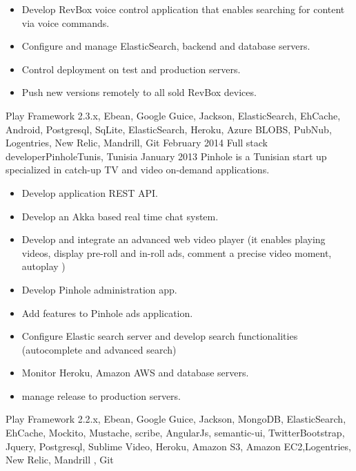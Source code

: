 \begin{experiences}
{\begin{itemize}
                        \item Develop RevBox voice control application that enables searching for content via voice commands.
                        \item Configure and manage ElasticSearch, backend and database servers.
                        \item Control deployment on test and production servers.
                        \item Push new versions remotely to all sold RevBox devices.
                      \end{itemize}
                    }
                    { Play Framework 2.3.x, Ebean, Google Guice, Jackson, ElasticSearch, EhCache, Android, Postgresql, SqLite, ElasticSearch, Heroku, Azure BLOBS, PubNub, Logentries, New Relic, Mandrill, Git}
  \emptySeparator
  \experience
    {February 2014}   {Full stack developer}{Pinhole}{Tunis, Tunisia}
    {January 2013} {Pinhole is a Tunisian start up specialized in catch-up TV and video on-demand applications.}
                    {
                      \begin{itemize}
                        \item Develop application REST API.
                        \item Develop an Akka based real time chat system.
                        \item Develop and integrate an advanced web video player (it enables playing videos, display pre-roll and in-roll ads, comment a precise video moment, autoplay )
                        \item Develop Pinhole administration app.
                        \item Add features to Pinhole ads application.
                        \item Configure Elastic search server and develop search functionalities (autocomplete and advanced search)
                        \item Monitor Heroku, Amazon AWS and database servers.
                        \item manage release to production servers.
                      \end{itemize}
                    }
                    {Play Framework 2.2.x, Ebean, Google Guice, Jackson, MongoDB, ElasticSearch, EhCache, Mockito, Mustache, scribe, AngularJs, semantic-ui, TwitterBootstrap, Jquery, Postgresql, Sublime Video, Heroku, Amazon S3, Amazon EC2,Logentries, New Relic, Mandrill , Git}

\end{experiences}
